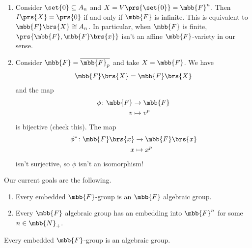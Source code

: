 \documentclass[10pt,a4paper,twoside,openany,hidelinks]{book}
\begin{document}
\begin{remark}
\begin{enumerate}
\item Consider $\set{0} \subseteq A_n$ and $X = V\prs{\set{0}} = \mbb{F}^n$. Then $I\prs{X} = \prs{0}$ if and only if $\mbb{F}$ is infinite. This is equivalent to $\mbb{F}\brs{X} \cong A_n$.
In particular, when $\mbb{F}$ is finite, $\prs{\mbb{F}, \mbb{F}\brs{x}}$ isn't an affine $\mbb{F}$-variety in our sense.

\item
Consider $\mbb{F} = \overline{\mbb{F}_p}$ and take $X = \mbb{F}$. We have
\begin{align*}
\mbb{F}\brs{X} = \mbb{F}\brs{X}
\end{align*}
and the map
\begin{align*}
\phi \colon \mbb{F} &\to \mbb{F} \\
v &\mapsto v^p
\end{align*}
is bijective (check this).
The map
\begin{align*}
\phi^* \colon \mbb{F}\brs{x} &\to \mbb{F}\brs{x} \\
x &\mapsto x^p
\end{align*}
isn't surjective, so $\phi$ isn't an isomorphism!
\end{enumerate}
\end{remark}

Our current goals are the following.

\begin{enumerate}
\item Every embedded $\mbb{F}$-group is an $\mbb{F}$ algebraic group.

\item Every $\mbb{F}$ algebraic group has an embedding into $\mbb{F}^n$ for some $n \in \mbb{N}_+$.
\end{enumerate}

\begin{proposition}
Every embedded $\mbb{F}$-group is an algebraic group.
\end{proposition}
\end{document}
